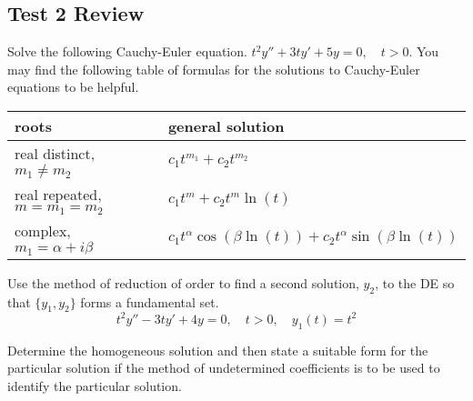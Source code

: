 \documentclass[12pt]{exam}
\begin{document}
\subsection*{Test 2 Review}
\begin{questions}

\question[1] Solve the following Cauchy-Euler equation. $t^2y'' + 3ty' + 5y = 0, \quad t > 0$. You may find the following table of formulas for the solutions to Cauchy-Euler equations to be helpful. 

\begin{center}
    \begin{tabular}{ p{6.2cm} p{6cm} }
        roots &  general solution 
        \\[2pt] \hline 
        real distinct, $m_1 \ne m_2$ &  $c_1 t^{m_1} + c_2 t^{m_2}$\\       
        real repeated, $m = m_1 = m_2$ & $c_1 t^{m} + c_2 t^m \ln(t)$\\
        complex, $m_1 = \alpha + i \beta$ & $c_1t^{\alpha}\cos(\beta \ln(t)) + c_2t^{\alpha}\sin(\beta \ln (t))$\\[2pt] \hline
    \end{tabular}    
\end{center}

\vspace{5cm}

\question[1] Use the method of reduction of order to find a second solution, $y_2$, to the DE so that $\{y_1,y_2\}$ forms a fundamental set. $$t^2 y'' - 3t y' + 4y = 0, \quad t>0, \quad y_1(t) = t^2$$



\newpage 
\question[2] Determine the homogeneous solution and then state a suitable form for the particular solution if the method of undetermined coefficients is to be used to identify the particular solution. 
    \vfill
    
\end{questions}
\end{document}
